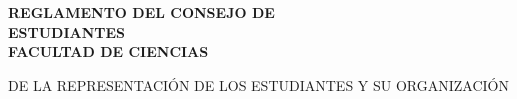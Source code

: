 \documentclass[11pt,a4paper]{article}
\begin{document}
\thispagestyle{portada}
\vspace*{50mm}
\begin{center}
{\fontsize{26}{32}\selectfont\bfseries REGLAMENTO DEL CONSEJO DE\\[2pt] ESTUDIANTES\\[2pt] FACULTAD DE CIENCIAS\par}
\vspace{6pt}
{\fontsize{11}{14}\selectfont DE LA REPRESENTACIÓN DE LOS ESTUDIANTES Y SU ORGANIZACIÓN\par}
\end{center}
\clearpage

\tableofcontents
\clearpage


\end{document}
